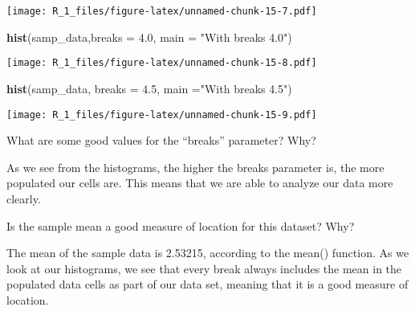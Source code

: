 \documentclass[
]{article}
\newenvironment{Shaded}{\begin{snugshade}}{\end{snugshade}}
\newcommand{\AttributeTok}[1]{\textcolor[rgb]{0.13,0.29,0.53}{#1}}
\newcommand{\FloatTok}[1]{\textcolor[rgb]{0.00,0.00,0.81}{#1}}
\newcommand{\FunctionTok}[1]{\textcolor[rgb]{0.13,0.29,0.53}{\textbf{#1}}}
\newcommand{\NormalTok}[1]{#1}
\newcommand{\StringTok}[1]{\textcolor[rgb]{0.31,0.60,0.02}{#1}}
\begin{document}
\texttt{[image: R\_1\_files/figure-latex/unnamed-chunk-15-7.pdf]}

\begin{Shaded}
\begin{Highlighting}[]
  \FunctionTok{hist}\NormalTok{(samp\_data,}\AttributeTok{breaks =} \FloatTok{4.0}\NormalTok{, }\AttributeTok{main =} \StringTok{"With breaks 4.0"}\NormalTok{)}
\end{Highlighting}
\end{Shaded}

\texttt{[image: R\_1\_files/figure-latex/unnamed-chunk-15-8.pdf]}

\begin{Shaded}
\begin{Highlighting}[]
  \FunctionTok{hist}\NormalTok{(samp\_data, }\AttributeTok{breaks =} \FloatTok{4.5}\NormalTok{, }\AttributeTok{main =}\StringTok{"With breaks 4.5"}\NormalTok{)}
\end{Highlighting}
\end{Shaded}

\texttt{[image: R\_1\_files/figure-latex/unnamed-chunk-15-9.pdf]}

What are some good values for the ``breaks'' parameter? Why?

As we see from the histograms, the higher the breaks parameter is, the
more populated our cells are. This means that we are able to analyze our
data more clearly.

Is the sample mean a good measure of location for this dataset? Why?

The mean of the sample data is 2.53215, according to the mean()
function. As we look at our histograms, we see that every break always
includes the mean in the populated data cells as part of our data set,
meaning that it is a good measure of location.
\end{document}
